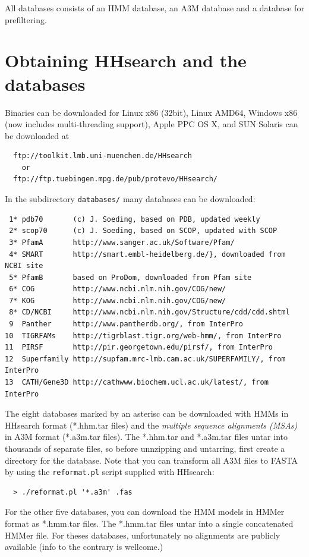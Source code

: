 \documentclass[11pt,a4paper]{article}
\begin{document}
All databases consists of an HMM database, an A3M database and a database for prefiltering.

\section{Obtaining HHsearch and the databases}

Binaries can be downloaded for Linux x86 (32bit), Linux AMD64, Windows x86 (now includes multi-threading support),
Apple PPC OS X, and SUN Solaris can be downloaded at
\begin{verbatim}
  ftp://toolkit.lmb.uni-muenchen.de/HHsearch
    or 
  ftp://ftp.tuebingen.mpg.de/pub/protevo/HHsearch/
\end{verbatim}

In the subdirectory \verb`databases/` many databases can be downloaded:
\small 
\begin{verbatim}
 1* pdb70       (c) J. Soeding, based on PDB, updated weekly
 2* scop70      (c) J. Soeding, based on SCOP, updated with SCOP
 3* PfamA       http://www.sanger.ac.uk/Software/Pfam/
 4* SMART       http://smart.embl-heidelberg.de/}, downloaded from NCBI site
 5* PfamB       based on ProDom, downloaded from Pfam site
 6* COG         http://www.ncbi.nlm.nih.gov/COG/new/
 7* KOG	        http://www.ncbi.nlm.nih.gov/COG/new/
 8* CD/NCBI     http://www.ncbi.nlm.nih.gov/Structure/cdd/cdd.shtml
 9  Panther     http://www.pantherdb.org/, from InterPro
10  TIGRFAMs    http://tigrblast.tigr.org/web-hmm/, from InterPro
11  PIRSF       http://pir.georgetown.edu/pirsf/, from InterPro
12  Superfamily http://supfam.mrc-lmb.cam.ac.uk/SUPERFAMILY/, from InterPro
13  CATH/Gene3D http://cathwww.biochem.ucl.ac.uk/latest/, from InterPro 
\end{verbatim} 
\normalsize

The eight databases marked by an asterisc can be downloaded with HMMs in HHsearch 
format (*.hhm.tar files) and the \emph{multiple sequence alignments (MSAs)} in 
A3M format (*.a3m.tar files). The *.hhm.tar and *.a3m.tar files untar into thousands
of separate files, so before unnzipping and untarring, first create a directory for 
the database. Note that you can transform all A3M files to FASTA by using the 
\verb`reformat.pl` script supplied with HHsearch:
\begin{verbatim}
  > ./reformat.pl '*.a3m' .fas
\end{verbatim}

For the other five databases, you can download the HMM models in HMMer format as 
*.hmm.tar files. The *.hmm.tar files untar into a single concatenated HMMer file. 
For theses databases, unfortunately no alignments are publicly available (info to the 
contrary is wellcome.) 
\end{document}
